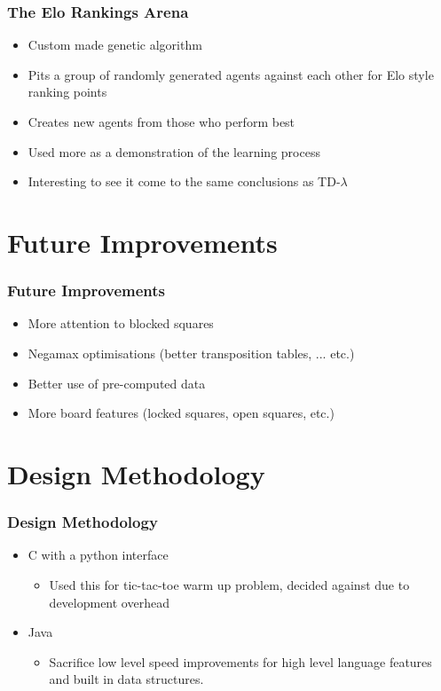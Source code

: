 \documentclass[10pt]{beamer}
\newcommand{\bcen}{\begin{center}}
\newcommand{\ecen}{\end{center}}
\begin{document}
\begin{frame}
  \frametitle{The Elo Rankings Arena}
  \begin{itemize}
  \item<1-> Custom made genetic algorithm
  \item<1-> Pits a group of randomly generated agents against each other for Elo style ranking points
  \item<1-> Creates new agents from those who perform best
  \item<2-> Used more as a demonstration of the learning process
  \item<2-> Interesting to see it come to the same conclusions as TD-$\lambda$
  \end{itemize}
\end{frame}

\section{Future Improvements}

\begin{frame}
  \frametitle{Future Improvements}
  \begin{itemize}
  \item<1-> More attention to blocked squares
  \item<2-> Negamax optimisations (better transposition tables, ... etc.)
  \item<3-> Better use of pre-computed data
  \item<4-> More board features (locked squares, open squares, etc.)
  \end{itemize}
\end{frame}

\section{Design Methodology}

\begin{frame}
\frametitle{Design Methodology}
  \bcen
  \begin{itemize}
  \item<1-> C with a python interface
      \begin{itemize}
        \item<1-> Used this for tic-tac-toe warm up problem, decided against due to development overhead 
      \end{itemize}
  \item<2-> Java
      \begin{itemize}
        \item<2->  Sacrifice low level speed improvements for high level language features and built in data structures.
      \end{itemize}
  \end{itemize}
  \ecen
\end{frame}
\end{document}
